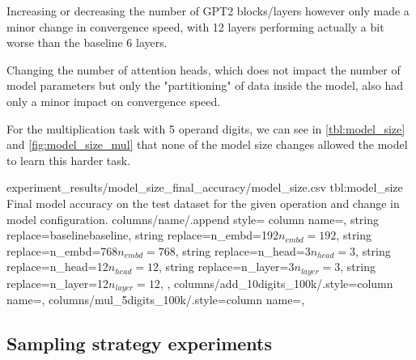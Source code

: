 Increasing or decreasing the number of GPT2 blocks/layers however only made a minor change in convergence speed, with 12 layers performing actually a bit worse than the baseline 6 layers.

Changing the number of attention heads, which does not impact the number of model parameters but only the "partitioning" of data inside the model, also had only a minor impact on convergence speed.

For the multiplication task with 5 operand digits, we can see in \cref{tbl:model_size} and \cref{fig:model_size_mul} that none of the model size changes allowed the model to learn this harder task.


{experiment_results/model_size_final_accuracy/model_size.csv}
{tbl:model_size}
{Final model accuracy on the test dataset for the given operation and change in model configuration.}
{%
	columns/name/.append style={
		column name={},
		string replace={baseline}{baseline},
		string replace={n_embd=192}{$n_{embd}=192$},
		string replace={n_embd=768}{$n_{embd}=768$},
		string replace={n_head=3}{$n_{head}=3$},
		string replace={n_head=12}{$n_{head}=12$},
		string replace={n_layer=3}{$n_{layer}=3$},
		string replace={n_layer=12}{$n_{layer}=12$},
	},
	columns/add_10digits_100k/.style={column name={}},
	columns/mul_5digits_100k/.style={column name={}},
}





\FloatBarrier
\subsection{Sampling strategy experiments}
\label{results:sampling}


